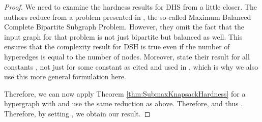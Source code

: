 \documentclass{article}
\theoremstyle{plain}
\theoremstyle{definition}
\begin{document}
\begin{proof}
We need to examine the hardness results for DHS from \cite{HajiSubhypergraph} a little closer. The authors reduce from a problem presented in \cite{FeigeKogan04}, the so-called 
Maximum Balanced Complete Bipartite Subgraph Problem. However, they omit the fact that the input graph for that problem is not just bipartite but balanced as well. 
This ensures that the complexity result for DSH is true even if the number of hyperedges is equal to the number of nodes. 
Moreover, \cite{FeigeKogan04} state their result for all constants , not just for some constant as cited and used in \cite{HajiSubhypergraph}, 
which is why we also use this more general formulation here.  

Therefore, we can now apply Theorem \ref{thm:SubmaxKnapsackHardness} for a hypergraph with   and use the same reduction as above. 
Therefore,  and thus
. Therefore, by setting , we obtain our result. 
\end{proof}







\end{document}
